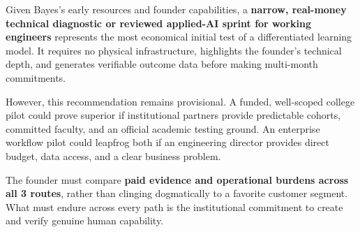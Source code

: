Given Bayes's early resources and founder capabilities, a \textbf{narrow, real-money technical diagnostic or reviewed applied-AI sprint for working engineers} represents the most economical initial test of a differentiated learning model. It requires no physical infrastructure, highlights the founder's technical depth, and generates verifiable outcome data before making multi-month commitments.

However, this recommendation remains provisional. A funded, well-scoped college pilot could prove superior if institutional partners provide predictable cohorts, committed faculty, and an official academic testing ground. An enterprise workflow pilot could leapfrog both if an engineering director provides direct budget, data access, and a clear business problem.

The founder must compare \textbf{paid evidence and operational burdens across all 3 routes}, rather than clinging dogmatically to a favorite customer segment. What must endure across every path is the institutional commitment to create and verify genuine human capability.
